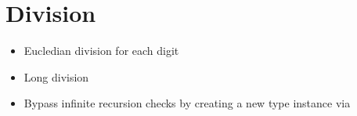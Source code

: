 \section{Division}

\begin{itemize}
  \item Eucledian division for each digit
  \item Long division
  \item Bypass infinite recursion checks by creating a new type instance via 
\end{itemize}